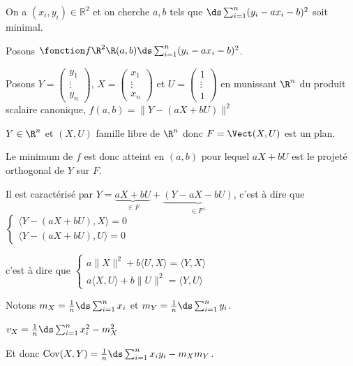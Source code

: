 \begin{exemple}
    On a $(x_i, y_i) \in \mathbb R^2$ et on cherche $a, b$ tels que 
    $\ds \sum_{i = 1}^n (y_i - ax_i - b)^2$ soit minimal.

    Posons $\fonction f {\R^2}{\R}{(a, b)}{\ds \sum_{i = 1}^n (y_i - ax_i - b)^2}$.

    Posons $Y = \begin{pmatrix}
y_1 \\
\vdots \\
y_n
\end{pmatrix}$, $X = \begin{pmatrix}
    x_1 \\
    \vdots \\
    x_n
    \end{pmatrix}$ et $U = \begin{pmatrix}
    1 \\
    \vdots \\
    1
    \end{pmatrix}$ en munissant $\R^n$ du produit scalaire canonique, 
    $f(a, b) = \| Y - (a X + bU) \|^2$ 

    $Y \in \R^n$ et $(X, U)$ famille libre de $\R^n$ donc $F = \Vect(X, U)$ est un plan. 

    Le minimum de $f$ est donc atteint en $(a, b)$ pour lequel $aX + bU$ est le projeté
    orthogonal de $Y$ sur $F$. 

    Il est caractérisé par $Y = \underbrace{aX + bU}_{\in F} + \underbrace{(Y - aX - bU)}_{\in F^\perp}$, 
    c'est à dire que 
    $\begin{cases}
        \langle Y - (aX + bU), X \rangle = 0 \\
        \langle Y - (aX + bU), U \rangle = 0
    \end{cases}$
    
    c'est à dire que $\begin{cases}
        a \|X\|^2 + b \langle U, X \rangle = \langle Y, X \rangle \\
        a \langle X, U \rangle + b \|U\|^2 = \langle Y, U \rangle
    \end{cases}$

    Notons $m_X = \frac 1 n \ds \sum_{i = 1}^n x_i$ et $m_Y = \frac 1 n \ds \sum_{i = 1}^n y_i$.

    $v_X = \frac 1 n \ds \sum_{i = 1 }^{n } x_i^2 - m_X^2$

    Et donc $\operatorname{Cov} (X, Y) = \frac 1 n \ds \sum_{i = 1}^n x_i y_i - m_X m_Y$.


\end{exemple}
